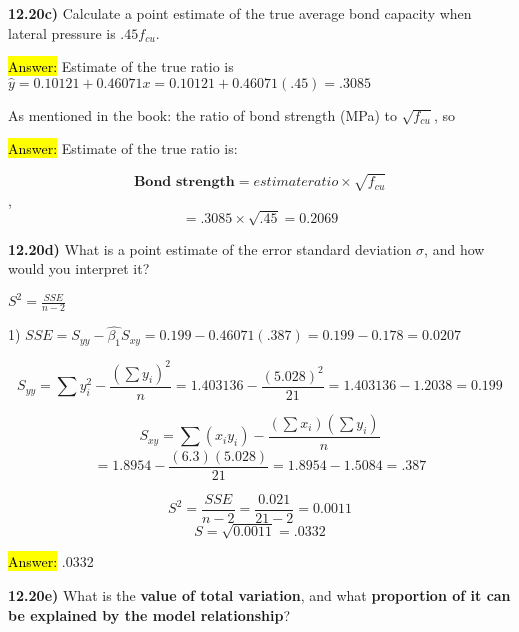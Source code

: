 \documentclass{article}
\begin{document}
\textbf{12.20c)} Calculate a point estimate of the true average bond capacity when lateral pressure is $.45f_{cu}$.

\vspace{2mm}


 \hl{Answer:}  Estimate of the true ratio is $\hat{y}=0.10121+0.46071x=0.10121+0.46071(.45)=.3085$
 
 \vspace{2mm}
 
 As mentioned in the book: the ratio of bond strength (MPa) to $\sqrt{f_{cu}}$, so 
 
 \vspace{2mm}
  
\hl{Answer:} Estimate of the true ratio is:

$$\textbf{Bond strength}=estimate ratio \times \sqrt{f_{cu}}$$,
 $$=.3085 \times \sqrt{.45}=0.2069$$

  



\newpage

\textbf{12.20d)} What is a point estimate of the error standard deviation $\sigma$, and how would you interpret it?

\vspace{2mm}


$S^{2}=\frac{SSE}{n-2}$

\vspace{2mm}



1) $SSE=S_{yy}-\hat{\beta_{1}}S_{xy}=0.199-0.46071(.387)=0.199-0.178=0.0207$

\vspace{2mm}

$$S_{yy}=\sum y_{i}^{2}-\frac{(\sum y_{i})^{2}}{n}=1.403136-\frac{(5.028)^{2}}{21}=1.403136-1.2038=0.199$$


$$ S_{xy}=\sum (x_{i}y_{i})-\frac{(\sum x_{i})(\sum y_{i})}{n}$$
$$=1.8954-\frac{(6.3)(5.028)}{21}=1.8954-1.5084=.387$$


\vspace{2mm}


$$S^{2}=\frac{SSE}{n-2}=\frac{0.021}{21-2}=0.0011$$
$$S=\sqrt{0.0011}=.0332$$

\hl{Answer:} .0332

\vspace{5mm}

    \textbf{12.20e)} What is the \textbf{value of total variation}, and what \textbf{proportion of it can be explained by the model relationship}?
    
\end{document}
